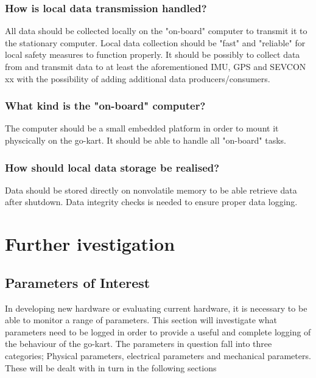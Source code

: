 \subsubsection*{How is local data transmission handled?}
All data should be collected locally on the "on-board" computer to transmit it to the stationary computer.
Local data collection should be "fast" and "reliable" for local safety measures to function properly.
It should be possibly to collect data from and transmit data to at least the 
aforementioned IMU, GPS and SEVCON xx with the possibility of adding additional 
data producers/consumers.

\subsubsection*{What kind is the "on-board" computer?}
The computer should be a small embedded platform in order to mount it physcically on the go-kart.
It should be able to handle all "on-board" tasks.

\subsubsection*{How should local data storage be realised?}
Data should be stored directly on nonvolatile memory to be able retrieve data after shutdown.
Data integrity checks is needed to ensure proper data logging.

\newpage
\section{Further ivestigation}

\subsection{Parameters of Interest}
In developing new hardware or evaluating current hardware, it is necessary to be able to monitor a range of parameters.
This section will investigate what parameters need to be logged in order to provide a useful and complete logging of the behaviour of the go-kart.
The parameters in question fall into three categories; Physical parameters, electrical parameters and mechanical parameters.
These will be dealt with in turn in the following sections

